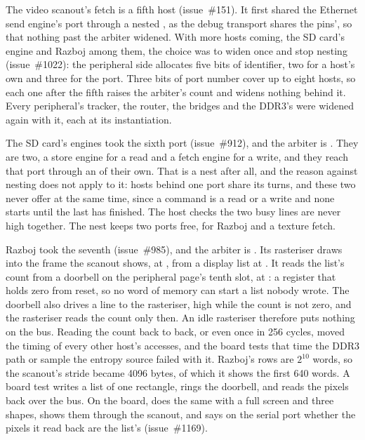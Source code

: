 \documentclass[journal,onecolumn,9pt]{IEEEtran}
\begin{document}
The video scanout's fetch is a fifth host (issue~\#151). It first
shared the Ethernet send engine's port through a nested
, as the debug transport shares the pins', so that
nothing past the arbiter widened. With more hosts coming, the SD
card's engine and Razboj among them, the choice was to widen once and
stop nesting (issue~\#1022): the peripheral side allocates five bits of
identifier, two for a host's own and three for the port. Three bits of
port number cover up to eight hosts, so each one after the fifth
raises the arbiter's count and widens nothing behind it. Every
peripheral's tracker, the router, the bridges and the DDR3's were
widened again with it, each at its instantiation.

The SD card's engines took the sixth port (issue~\#912), and the
arbiter is . They are two, a store engine for a read
and a fetch engine for a write, and they reach that port through an
 of their own. That is a nest after all, and the reason
against nesting does not apply to it: hosts behind one port share its
turns, and these two never offer at the same time, since a command
is a read or a write and none starts until the last has finished.
The host checks the two busy lines are never high together. The nest
keeps two ports free, for Razboj and a texture fetch.

Razboj took the seventh (issue~\#985), and the arbiter is
. Its rasteriser draws into the frame the scanout
shows, at , from a display list at
. It reads the list's count from a doorbell on the
peripheral page's tenth slot, at : a register that holds
zero from reset, so no word of memory can start a list nobody wrote.
The doorbell also drives a line to the rasteriser, high while the
count is not zero, and the rasteriser reads the count only then. An
idle rasteriser therefore puts nothing on the bus. Reading the count
back to back, or even once in 256 cycles, moved the timing of every
other host's accesses, and the board tests that time the DDR3 path
or sample the entropy source failed with it. Razboj's rows are
$2^{10}$ words, so the scanout's stride became 4096 bytes, of which
it shows the first 640 words. A board test writes a list of one rectangle,
rings the doorbell, and reads the pixels back over the bus.
On the board,  does the same with a full screen and
three shapes, shows them through the scanout, and says on the serial
port whether the pixels it read back are the list's
(issue~\#1169).
\end{document}
